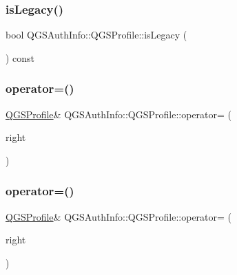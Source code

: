 \subsubsection{\texorpdfstring{is\+Legacy()}{isLegacy()}}
{\footnotesize\ttfamily bool Q\+G\+S\+Auth\+Info\+::\+Q\+G\+S\+Profile\+::is\+Legacy (\begin{DoxyParamCaption}{ }\end{DoxyParamCaption}) const}

\mbox{\label{class_q_g_s_auth_info_1_1_q_g_s_profile_a8320abec42dc150062909b862ad22df4}} 
\subsubsection{\texorpdfstring{operator=()}{operator=()}\hspace{0.1cm}{\footnotesize\ttfamily [1/2]}}
{\footnotesize\ttfamily \mbox{\hyperlink{class_q_g_s_auth_info_1_1_q_g_s_profile}{Q\+G\+S\+Profile}}\& Q\+G\+S\+Auth\+Info\+::\+Q\+G\+S\+Profile\+::operator= (\begin{DoxyParamCaption}\item[{const \mbox{\hyperlink{class_q_g_s_auth_info_1_1_q_g_s_profile}{Q\+G\+S\+Profile}} \&}]{right }\end{DoxyParamCaption})\hspace{0.3cm}{\ttfamily [default]}}

\mbox{\label{class_q_g_s_auth_info_1_1_q_g_s_profile_a687c14451eec05aa3065717c4138e33e}} 
\subsubsection{\texorpdfstring{operator=()}{operator=()}\hspace{0.1cm}{\footnotesize\ttfamily [2/2]}}
{\footnotesize\ttfamily \mbox{\hyperlink{class_q_g_s_auth_info_1_1_q_g_s_profile}{Q\+G\+S\+Profile}}\& Q\+G\+S\+Auth\+Info\+::\+Q\+G\+S\+Profile\+::operator= (\begin{DoxyParamCaption}\item[{\mbox{\hyperlink{class_q_g_s_auth_info_1_1_q_g_s_profile}{Q\+G\+S\+Profile}} \&\&}]{right }\end{DoxyParamCaption})\hspace{0.3cm}{\ttfamily [default]}}

